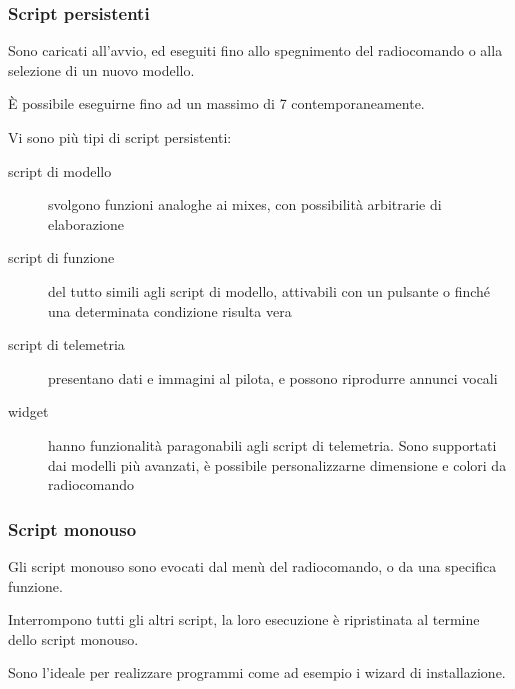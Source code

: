 \documentclass{beamer}
\begin{document}
\begin{frame}
        \frametitle{Script persistenti}
        Sono caricati all'avvio, ed eseguiti fino allo spegnimento del radiocomando o alla selezione di un nuovo modello.
        

        È possibile eseguirne fino ad un massimo di 7 contemporaneamente.
        

        Vi sono più tipi di script persistenti:
        
        \begin{description}
                \item[script di modello] svolgono funzioni analoghe ai mixes, con possibilità arbitrarie di elaborazione
        
                \item[script di funzione] del tutto simili agli script di modello, attivabili con un pulsante o finché una determinata condizione risulta vera
        
                \item[script di telemetria] presentano dati e immagini al pilota, e possono riprodurre annunci vocali
        
                \item[widget] hanno funzionalità paragonabili agli script di telemetria. Sono supportati dai modelli più avanzati, è possibile personalizzarne dimensione e colori da radiocomando
        \end{description}

\end{frame}

\begin{frame}
        \frametitle{Script monouso}
        Gli script monouso sono evocati dal menù del radiocomando, o da una specifica funzione.\newline
        
        Interrompono tutti gli altri script, la loro esecuzione è ripristinata al termine dello script monouso.\newline
        
        Sono l'ideale per realizzare programmi come ad esempio i wizard di installazione.\newline
\end{frame}
\end{document}
